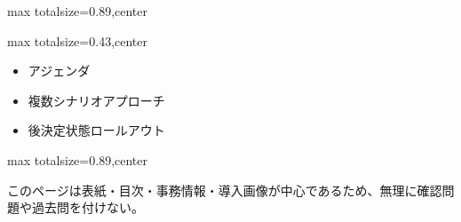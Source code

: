 \begin{minipage}[t]{0.58\textwidth}
\begin{adjustbox}{max totalsize={\textwidth}{0.89\textheight},center}
\begin{minipage}{\textwidth}
\end{minipage}
\end{adjustbox}
\end{minipage}


\clearpage
{}
\begin{minipage}[t]{0.405\textwidth}
\begin{adjustbox}{max totalsize={\textwidth}{0.43\textheight},center}
\begin{minipage}{\textwidth}\scriptsize
{}\begin{itemize}
\item アジェンダ
\item 複数シナリオアプローチ
\item 後決定状態ロールアウト
\end{itemize}
\end{minipage}
\end{adjustbox}
\end{minipage}\hfill
\begin{minipage}[t]{0.58\textwidth}
\begin{adjustbox}{max totalsize={\textwidth}{0.89\textheight},center}
\begin{minipage}{\textwidth}\scriptsize
{}このページは表紙・目次・事務情報・導入画像が中心であるため、無理に確認問題や過去問を付けない。
\end{minipage}
\end{adjustbox}
\end{minipage}


